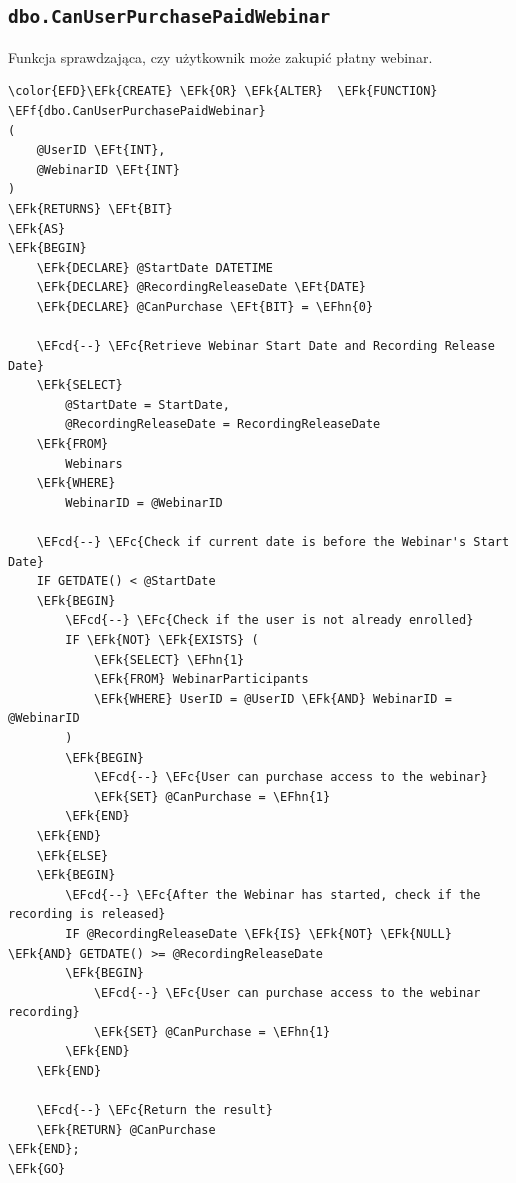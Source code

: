 \documentclass[11pt]{article}
\newcommand{\EFc}[1]{\textcolor{EFc}{\textit{#1}}} %
\newcommand{\EFcd}[1]{\textcolor{EFcd}{\textit{#1}}} %
\newcommand{\EFk}[1]{\textcolor{EFk}{\textbf{#1}}} %
\newcommand{\EFf}[1]{\textcolor{EFf}{#1}} %
\newcommand{\EFt}[1]{\textcolor{EFt}{\textbf{#1}}} %
\newcommand{\EFhn}[1]{\textcolor{EFhn}{#1}} %
\begin{document}
\subsection{\texttt{dbo.CanUserPurchasePaidWebinar}}
\label{sec:orgd9c9c0a}
Funkcja sprawdzająca, czy użytkownik może zakupić płatny webinar.
\begin{Code}
\begin{Verbatim}
\color{EFD}\EFk{CREATE} \EFk{OR} \EFk{ALTER}  \EFk{FUNCTION} \EFf{dbo.CanUserPurchasePaidWebinar}
(
    @UserID \EFt{INT},
    @WebinarID \EFt{INT}
)
\EFk{RETURNS} \EFt{BIT}
\EFk{AS}
\EFk{BEGIN}
    \EFk{DECLARE} @StartDate DATETIME
    \EFk{DECLARE} @RecordingReleaseDate \EFt{DATE}
    \EFk{DECLARE} @CanPurchase \EFt{BIT} = \EFhn{0}

    \EFcd{--} \EFc{Retrieve Webinar Start Date and Recording Release Date}
    \EFk{SELECT} 
        @StartDate = StartDate, 
        @RecordingReleaseDate = RecordingReleaseDate
    \EFk{FROM} 
        Webinars
    \EFk{WHERE} 
        WebinarID = @WebinarID

    \EFcd{--} \EFc{Check if current date is before the Webinar's Start Date}
    IF GETDATE() < @StartDate
    \EFk{BEGIN}
        \EFcd{--} \EFc{Check if the user is not already enrolled}
        IF \EFk{NOT} \EFk{EXISTS} (
            \EFk{SELECT} \EFhn{1}
            \EFk{FROM} WebinarParticipants
            \EFk{WHERE} UserID = @UserID \EFk{AND} WebinarID = @WebinarID
        )
        \EFk{BEGIN}
            \EFcd{--} \EFc{User can purchase access to the webinar}
            \EFk{SET} @CanPurchase = \EFhn{1}
        \EFk{END}
    \EFk{END}
    \EFk{ELSE}
    \EFk{BEGIN}
        \EFcd{--} \EFc{After the Webinar has started, check if the recording is released}
        IF @RecordingReleaseDate \EFk{IS} \EFk{NOT} \EFk{NULL} \EFk{AND} GETDATE() >= @RecordingReleaseDate
        \EFk{BEGIN}
            \EFcd{--} \EFc{User can purchase access to the webinar recording}
            \EFk{SET} @CanPurchase = \EFhn{1}
        \EFk{END}
    \EFk{END}

    \EFcd{--} \EFc{Return the result}
    \EFk{RETURN} @CanPurchase
\EFk{END};
\EFk{GO}
\end{Verbatim}
\end{Code}
\end{document}
